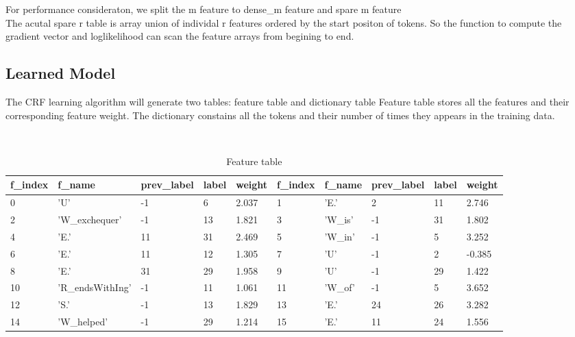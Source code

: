 For performance consideraton, we split the m feature to dense\_m feature and spare m feature\\
The acutal spare r table is array union of individal r features ordered by the start positon of tokens.
So the function to compute the gradient vector and loglikelihood can scan the feature arrays from begining to end.

\subsection{Learned Model}
The CRF learning algorithm will generate two tables: feature table and dictionary table
Feature table stores all the features and their corresponding feature weight.
The dictionary constains all the tokens and their number of times they appears in the training data.\\
\begin {table}[h!]
\caption {Feature table} \label{tab:title} 
\begin{center}
    \scriptsize\tt
    \begin{tabular}{ | l | l | l | l | l || l | l | l | l | l | }
    \hline
    f\_index & f\_name & prev\_label & label & weight & f\_index & f\_name & prev\_label & label & weight\\
    \hline
    0&'U'&-1&6&2.037& 1&'E.'&2&11&2.746   \\
    2&'W\_exchequer'&-1&13&1.821& 3&'W\_is'&-1&31&1.802 \\
    4&'E.'&11&31&2.469& 5&'W\_in'&-1&5&3.252 \\
    6&'E.'&11&12&1.305& 7&'U'&-1&2&-0.385 \\
    8&'E.'&31&29&1.958& 9&'U'&-1&29&1.422 \\
    10&'R\_endsWithIng'&-1&11&1.061&11&'W\_of'&-1&5&3.652 \\
    12&'S.'&-1&13&1.829& 13&'E.'&24&26&3.282 \\
    14&'W\_helped'&-1&29&1.214& 15&'E.'&11&24&1.556 \\
    \hline
    \end{tabular}
\end{center}
\end {table}

